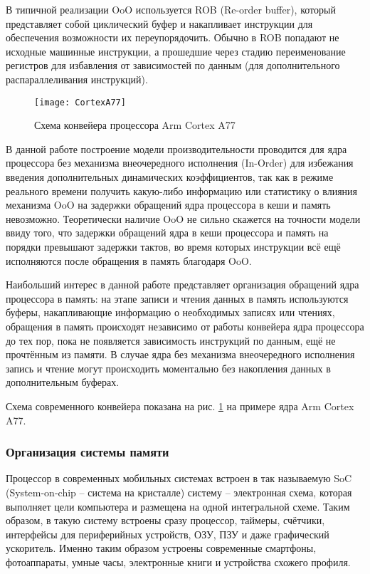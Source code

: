     В типичной реализации OoO используется ROB (Re-order buffer), который представляет собой
    циклический буфер и накапливает инструкции для обеспечения возможности их переупорядочить.
    Обычно в ROB попадают не исходные машинные инструкции, а прошедшие через стадию переименование
    регистров для избавления от зависимостей по данным (для дополнительного распараллеливания
    инструкций).

    \begin{figure}[!h]
        \caption{Схема конвейера процессора Arm Cortex A77 \cite{CortexA77Docs}}
        \centering
        \texttt{[image: CortexA77]}
        \label{cortexA77}
    \end{figure}

    В данной работе построение модели производительности проводится для ядра процессора без механизма
    внеочередного исполнения (In-Order) для избежания введения дополнительных динамических коэффициентов,
    так как в режиме реального времени получить какую-либо информацию или статистику о влияния механизма
    OoO на задержки обращений ядра процессора в кеши и память невозможно. Теоретически наличие OoO не
    сильно скажется на точности модели ввиду того, что задержки обращений ядра в кеши процессора и память
    на порядки превышают задержки тактов, во время которых инструкции всё ещё исполняются после обращения в память
    благодаря OoO.

    Наибольший интерес в данной работе представляет организация обращений ядра процессора в память: на этапе
    записи и чтения данных в память используются буферы, накапливающие информацию о необходимых записях
    или чтениях, обращения в память происходят независимо от работы конвейера ядра процессора до тех пор, пока
    не появляется зависимость инструкций по данным, ещё не прочтённым из памяти. В случае ядра без
    механизма внеочередного исполнения запись и чтение могут происходить моментально без накопления
    данных в дополнительным буферах.

    Схема современного конвейера показана на рис. \ref{cortexA77} на примере ядра Arm Cortex A77.

\subsubsection{Организация системы памяти}

    Процессор в современных мобильных системах встроен в так называемую SoC (System-on-chip --
    система на кристалле) систему -- электронная схема, которая выполняет цели компьютера
    и размещена на одной интегральной схеме. Таким образом, в такую систему встроены сразу процессор,
    таймеры, счётчики, интерфейсы для периферийных устройств, ОЗУ, ПЗУ и даже графический ускоритель.
    Именно таким образом устроены современные смартфоны, фотоаппараты, умные часы, электронные книги
    и устройства схожего профиля.

